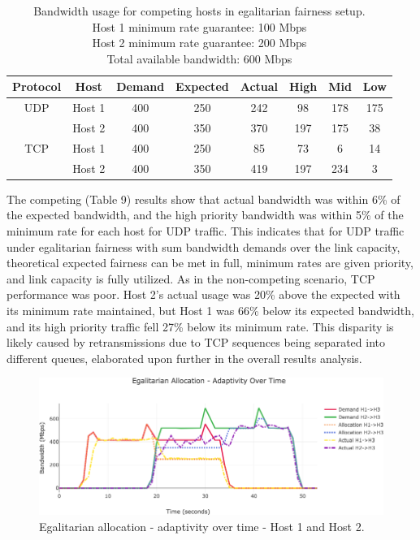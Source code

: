 \documentclass[accepted,single]{gipaper}
\begin{document}
\begin{table}[h]
	\label{egal_c}
	\vspace{-2mm}
	\begin{center}
		\begin{small}
		\setlength\tabcolsep{1.5pt}
			\begin{tabular}{cccccccc}
				Protocol & Host & Demand & Expected & Actual & High & Mid & Low\\
				\hline
				UDP & Host 1 & 400 & 250 & 242 & 98 & 178 & 175\\
				    & Host 2 & 400 & 350 & 370 & 197 & 175 & 38\\
				\hline
				TCP & Host 1 & 400 & 250 & 85 & 73 & 6 & 14\\
				    & Host 2 & 400 & 350 & 419 & 197 & 234 & 3\\
			\end{tabular}
		\end{small}
	\end{center}
	\caption{Bandwidth usage for competing hosts in egalitarian fairness setup.\\
	Host 1 minimum rate guarantee: 100 Mbps\\
	Host 2 minimum rate guarantee: 200 Mbps\\	
	Total available bandwidth: 600 Mbps}
	\vspace{-3mm}
\end{table}

The competing (Table 9) results show that actual bandwidth was within 6\% of the expected bandwidth, and the high priority bandwidth was within 5\% of the minimum rate for each host for UDP traffic. This indicates that for UDP traffic under egalitarian fairness with sum bandwidth demands over the link capacity, theoretical expected fairness can be met in full, minimum rates are given priority, and link capacity is fully utilized. As in the non-competing scenario, TCP performance was poor. Host 2's actual usage was 20\% above the expected with its minimum rate maintained, but Host 1 was 66\% below its expected bandwidth, and its high priority traffic fell 27\% below its minimum rate. This disparity is likely caused by retransmissions due to TCP sequences being separated into different queues, elaborated upon further in the overall results analysis.

\begin{figure}
	\centering
	\includegraphics[width=6in]{figs/dbae_ot_udp_both.png}
	\caption{ Egalitarian allocation - adaptivity over time - Host 1 and Host 2. } \label{dbae_ot_both}
\end{figure}
\end{document}
